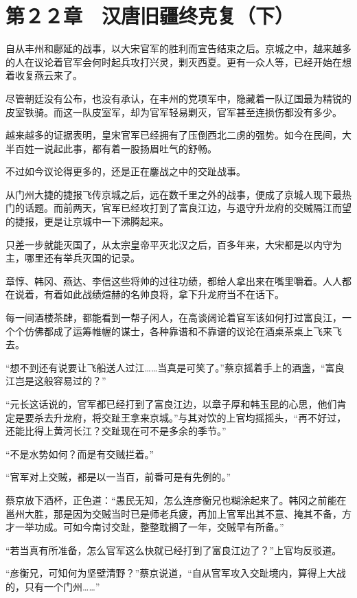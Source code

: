 \section{第２２章　汉唐旧疆终克复（下）}

自从丰州和鄜延的战事，以大宋官军的胜利而宣告结束之后。京城之中，越来越多的人在议论着官军会何时起兵攻打兴灵，剿灭西夏。更有一众人等，已经开始在想着收复燕云来了。

尽管朝廷没有公布，也没有承认，在丰州的党项军中，隐藏着一队辽国最为精锐的皮室铁骑。而这一队皮室军，却为官军轻易剿灭，官军甚至连损伤都没有多少。

越来越多的证据表明，皇宋官军已经拥有了压倒西北二虏的强势。如今在民间，大半百姓一说起此事，都有着一股扬眉吐气的舒畅。

不过如今议论得更多的，还是正在鏖战之中的交趾战事。

从门州大捷的捷报飞传京城之后，远在数千里之外的战事，便成了京城人现下最热门的话题。而前两天，官军已经攻打到了富良江边，与退守升龙府的交贼隔江而望的捷报，更是让京城中一下沸腾起来。

只差一步就能灭国了，从太宗皇帝平灭北汉之后，百多年来，大宋都是以内守为主，哪里还有举兵灭国的记录。

章惇、韩冈、燕达、李信这些将帅的过往功绩，都给人拿出来在嘴里嚼着。人人都在说着，有着如此战绩煊赫的名帅良将，拿下升龙府当不在话下。

每一间酒楼茶肆，都能看到一帮子闲人，在高谈阔论着官军该如何打过富良江，一个个仿佛都成了运筹帷幄的谋士，各种靠谱和不靠谱的议论在酒桌茶桌上飞来飞去。

“想不到还有说要让飞船送人过江……当真是可笑了。”蔡京摇着手上的酒盏，“富良江岂是这般容易过的？”

“元长这话说的，官军都已经打到了富良江边，以章子厚和韩玉昆的心思，他们肯定是要杀去升龙府，将交趾王拿来京城。”与其对饮的上官均摇摇头，“再不好过，还能比得上黄河长江？交趾现在可不是多余的季节。”

“不是水势如何？而是有交贼拦着。”

“官军对上交贼，都是以一当百，前番可是有先例的。”

蔡京放下酒杯，正色道：“愚民无知，怎么连彦衡兄也糊涂起来了。韩冈之前能在邕州大胜，那是因为交贼当时已是师老兵疲，再加上官军出其不意、掩其不备，方才一举功成。可如今南讨交趾，整整耽搁了一年，交贼早有所备。”

“若当真有所准备，怎么官军这么快就已经打到了富良江边了？”上官均反驳道。

“彦衡兄，可知何为坚壁清野？”蔡京说道，“自从官军攻入交趾境内，算得上大战的，只有一个门州……”


